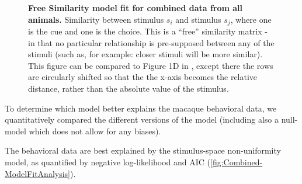 \begin{figure}
    \centering
    \begin{subfigure}[b]{0.3\textwidth}
         \centering
         \caption{}
         
         \label{fig:SimilarityMatrixCombined_Cool}
    \end{subfigure}
    \hfill
    \begin{subfigure}[b]{0.3\textwidth}
         \centering
         \caption{}
         
         \label{fig:SimilarityMatrixCombined_Warm}
    \end{subfigure}
    \hfill
       \begin{subfigure}[b]{0.3\textwidth}
         \centering
         \caption{}
         
         \label{fig:Combined-ModelFitAnalysis}
    \end{subfigure}
    \caption{\textbf{Free Similarity model fit for combined data from all animals.}
    Similarity between stimulus $s_i$ and stimulus $s_j$, where one is the cue and one is the choice. This is a ``free'' similarity matrix - in that no particular relationship is pre-supposed between any of the stimuli (such as, for example: closer stimuli will be more similar). This figure can be compared to Figure 1D in \cite{schurgin_psychophysical_2020}, except there the rows are circularly shifted so that the the x-axis becomes the relative distance, rather than the absolute value of the stimulus. %
    } 
    \label{fig:TCCOutput}
\end{figure}

To determine which model better explains the macaque behavioral data, we quantitatively compared the different versions of the model (including also a null-model which does not allow for any biases).

The behavioral data are best explained by the stimulus-space non-uniformity model, as quantified by negative log-likelihood and AIC (\autoref{fig:Combined-ModelFitAnalysis}). 

